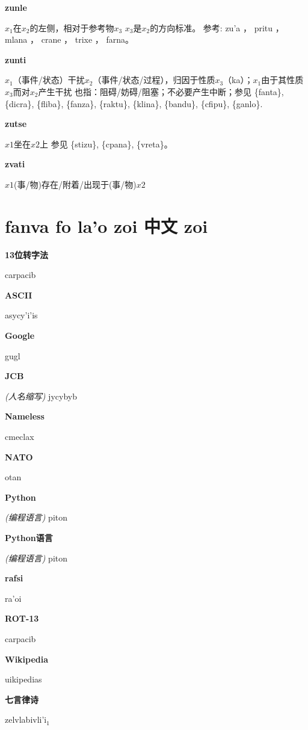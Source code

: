 \documentclass[notitlepage,twocolumn,a4paper,10pt]{book}
\begin{document}
{\sffamily\bfseries zunle}\enspace {\ttfamily\bfseries[zul]}  $x_1$在$x_2$的左侧，相对于参考物$x_3$ \textemdash{} $x_3$是$x_2$的方向标准。 参考: {zu'a} ， {pritu} ， {mlana} ， {crane} ， {trixe} ， {farna}。

{\sffamily\bfseries zunti}\enspace {\ttfamily\bfseries[zun     zu'i]}  $x_1$（事件\slash{}状态）干扰$x_2$（事件\slash{}状态\slash{}过程），归因于性质$x_3$（ka）；$x_1$由于其性质$x_3$而对$x_2$产生干扰 \textemdash{} 也指：阻碍\slash{}妨碍\slash{}阻塞；不必要产生中断；参见 \{fanta\}, \{dicra\}, \{fliba\}, \{fanza\}, \{raktu\}, \{klina\}, \{bandu\}, \{cfipu\}, \{ganlo\}.

{\sffamily\bfseries zutse}  $x1$坐在$x2$上 \textemdash{} 参见 \{stizu\}, \{cpana\}, \{vreta\}。

{\sffamily\bfseries zvati}\enspace {\ttfamily\bfseries[    zva]}  $x1$(事\slash{}物)存在\slash{}附着\slash{}出现于(事\slash{}物)$x2$
\chapter{fanva fo la'o zoi 中文 zoi}

{\sffamily\bfseries 13位转字法} carpacib

{\sffamily\bfseries ASCII} asycy'i'is

{\sffamily\bfseries Google} gugl

{\sffamily\bfseries JCB}\textit{(人名缩写)}  jycybyb

{\sffamily\bfseries Nameless} cmeclax

{\sffamily\bfseries NATO} otan

{\sffamily\bfseries Python}\textit{(编程语言)}  piton

{\sffamily\bfseries Python语言}\textit{(编程语言)}  piton

{\sffamily\bfseries rafsi} ra'oi

{\sffamily\bfseries ROT-13} carpacib

{\sffamily\bfseries Wikipedia} uikipedias

{\sffamily\bfseries 七言律诗} zelvlabivli'i$_{1}$
\end{document}

